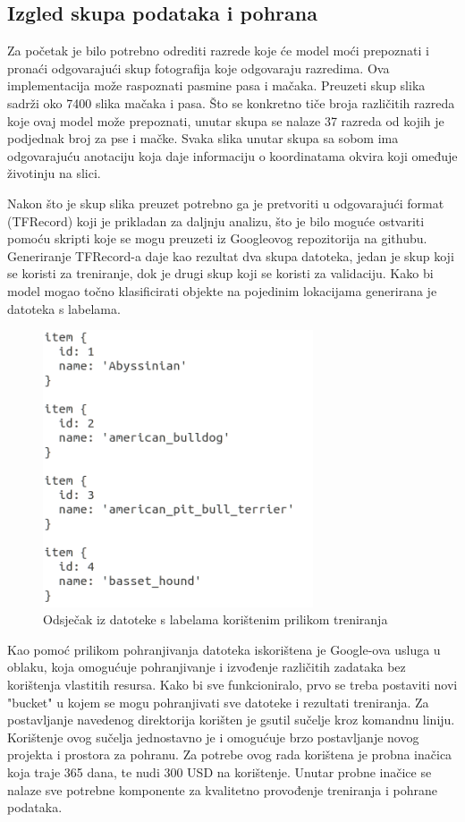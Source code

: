 \subsection{Izgled skupa podataka i pohrana}
Za početak je bilo potrebno odrediti razrede koje će model moći prepoznati i pronaći odgovarajući skup fotografija koje odgovaraju razredima. Ova implementacija može raspoznati pasmine pasa i mačaka. 
Preuzeti skup slika sadrži oko 7400 slika mačaka i pasa. Što se konkretno tiče broja različitih razreda koje ovaj model može prepoznati, unutar skupa se nalaze 37 razreda od kojih je podjednak
broj za pse i mačke. Svaka slika unutar skupa sa sobom ima odgovarajuću anotaciju koja daje informaciju o koordinatama okvira koji omeđuje životinju na slici. 

Nakon što je skup slika preuzet potrebno ga je pretvoriti u odgovarajući format (TFRecord) koji je prikladan za daljnju analizu, što je bilo moguće ostvariti pomoću skripti koje se mogu preuzeti iz Googleovog repozitorija na githubu.
Generiranje TFRecord-a daje kao rezultat dva skupa datoteka, jedan je skup koji se koristi za treniranje, dok je drugi skup koji se koristi za validaciju. Kako bi model mogao točno klasificirati objekte na pojedinim lokacijama generirana
je datoteka s labelama.

\begin{figure}[ht]
    \centering
    \includegraphics[width=8cm]{img/pet_labels.png}
    \caption{Odsječak iz datoteke s labelama korištenim prilikom treniranja}
    \label{Pet labels}
\end{figure}

Kao pomoć prilikom pohranjivanja datoteka iskorištena je Google-ova usluga u oblaku, koja omogućuje pohranjivanje i izvođenje različitih zadataka bez korištenja vlastitih resursa. 
Kako bi sve funkcioniralo, prvo se treba postaviti novi "bucket" u kojem se mogu pohranjivati sve datoteke i rezultati treniranja. Za postavljanje navedenog direktorija korišten je gsutil sučelje kroz 
komandnu liniju. Korištenje ovog sučelja jednostavno je i omogućuje brzo postavljanje novog projekta i prostora za pohranu. Za potrebe ovog rada korištena je probna inačica koja traje 365 dana, te nudi 300 USD na korištenje. 
Unutar probne inačice se nalaze sve potrebne komponente za kvalitetno provođenje treniranja i pohrane podataka.

